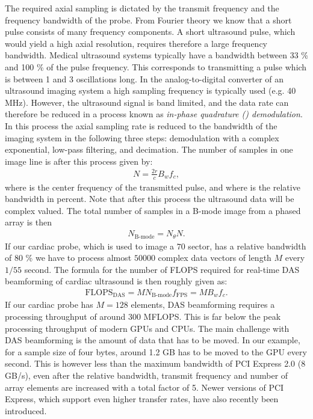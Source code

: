 The required axial sampling is dictated by the transmit frequency and the frequency bandwidth of the probe. From Fourier theory we know that a short pulse consists of many frequency components. A short ultrasound pulse, which would yield a high axial resolution, requires therefore a large frequency bandwidth. Medical ultrasound systems typically have a bandwidth between 33 \% and 100 \% of the pulse frequency. This corresponds to transmitting a pulse which is between 1 and 3 oscillations long. In the analog-to-digital converter of an ultrasound imaging system a high sampling frequency is typically used (e.g. 40 MHz). However, the ultrasound signal is band limited, and the data rate can therefore be reduced in a process known as \textit{in-phase quadrature () demodulation}. In this process the axial sampling rate is reduced to the bandwidth of the imaging system in the following three steps: demodulation with a complex exponential, low-pass filtering, and decimation. The number of samples in one image line is after this process given by:
\begin{align}
N = \frac{2r}{c}B_wf_c,
\end{align}
where  is the center frequency of the transmitted pulse, and where  is the relative bandwidth in percent. Note that after this process the ultrasound data will be complex valued. The total number of samples in a B-mode image from a phased array is then 
\begin{align}
N_{\text{B-mode}} = N_\theta N.
\end{align}
If our cardiac probe, which is used to image a $70$\degree{} sector, has a relative bandwidth of $80$ \% we have to process almost $50000$ complex data vectors of length $M$ every $1/55$ second. The formula for the number of FLOPS required for real-time DAS beamforming of cardiac ultrasound is then roughly given as:
\begin{align}
\text{FLOPS}_{\text{DAS}} = MN_{\text{B-mode}}f_{\text{FPS}} = MB_wf_c.
\end{align}
If our cardiac probe has $M=128$ elements, DAS beamforming requires a processing throughput of around $300$ MFLOPS. This is far below the peak processing throughput of modern GPUs and CPUs. The main challenge with DAS beamforming is the amount of data that has to be moved. In our example, for a sample size of four bytes, around 1.2 GB has to be moved to the GPU every second. This is however less than the maximum bandwidth of PCI Express 2.0 (8 GB/s), even after the relative bandwidth, transmit frequency and number of array elements are increased with a total factor of 5. Newer versions of PCI Express, which support even higher transfer rates, have also recently been introduced.

